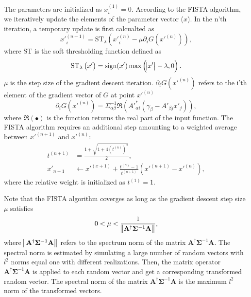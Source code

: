 \documentclass[twocolumn]{aastex62}
\begin{document}
The parameters are initialized as $x_i^{(1)}=0$. According to the FISTA algorithm, we iteratively
update the elements of the parameter vector ($x$). In the n'th iteration, a temporary update is first calcualted as
\begin{equation}
x'^{(n+1)}_{i}=\mathrm{ST}_{\lambda} \left(x'^{(n)}_{i} -\mu \partial_i G(x'^{(n)})\right),
\end{equation}
where $\mathrm{ST}$ is the soft thresholding function defined as
\begin{equation}
\mathrm{ST}_{\lambda} \left(x'\right) = \mathrm{sign} (x') \max \left(\abs{x'}-\lambda,0\right).
\end{equation}
$\mu$ is the step size of the gradient descent iteration.
$\partial_i G(x'^{(n)})$ refers to the i'th element of the gradient
vector of $G$ at point $x'^{(n)}$
\begin{equation}
\partial_i G(x'^{(n)})=\Sigma^{-1}_{\alpha\beta}\Re\left(A'^{*}_{\alpha i}(\gamma_{\beta}-A'_{\beta j}x'_{j})\right),
\end{equation}
where $\Re\left( \bullet \right)$ is the function returns the real part of the input function.
The FISTA algorithm requires an additional step amounting to a weighted average between
$x'^{(n+1)}$ and $x'^{(n)}$:
\begin{equation}
\begin{split}
t^{(n+1)}&=\frac{1+\sqrt{1+4(t^{(n)})^2}}{2},\\
x'_{n+1} &\leftarrow x'^{(x+1)}+ \frac{t^{(n)}-1}{t^{(n+1)}}(x'^{(n+1)}-x'^{(n)}),
\end{split}
\end{equation}
where the relative weight is initialized as $t^{(1)}=1$.

Note that the FISTA algorithm coverges as long as the gradient descent step size $\mu$ satisfies
\begin{equation}
 0< \mu < \frac{1}{ \norm{\mathbf{A^{\dagger}} \mathbf{\Sigma}^{-1} \mathbf{A} }},
\end{equation}
where $\norm{\mathbf{A^{\dagger}} \mathbf{\Sigma}^{-1} \mathbf{A} }$ refers to the spectrum norm of the matrix
$\mathbf{A^{\dagger}} \mathbf{\Sigma}^{-1} \mathbf{A}$. The spectral norm is estimated by simulating a large number of
random vectors with $l^2$ norms equal one with different realizations. Then, the matrix operator
$\mathbf{A^{\dagger}} \mathbf{\Sigma}^{-1} \mathbf{A}$ is applied to each random vector and get a corresponding transformed
random vector. The spectral norm of the matrix $\mathbf{A^{\dagger}} \mathbf{\Sigma}^{-1} \mathbf{A}$
is the maximum $l^2$ norm of the transformed vectors.
\end{document}
